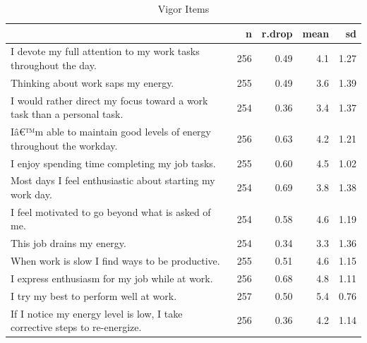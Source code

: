 \documentclass[
]{book}
\begin{document}
\begin{table}

\caption{\label{tab:rdrop5}Vigor Items}
\centering
\begin{tabular}[t]{l|r|r|r|r}
\hline
  & n & r.drop & mean & sd\\
\hline
I devote my full attention to my work tasks throughout the day. & 256 & 0.49 & 4.1 & 1.27\\
\hline
Thinking about work saps my energy. & 255 & 0.49 & 3.6 & 1.39\\
\hline
I would rather direct my focus toward a work task than a personal task. & 254 & 0.36 & 3.4 & 1.37\\
\hline
Iâ€™m able to maintain good levels of energy throughout the workday. & 256 & 0.63 & 4.2 & 1.21\\
\hline
I enjoy spending time completing my job tasks. & 255 & 0.60 & 4.5 & 1.02\\
\hline
Most days I feel enthusiastic about starting my work day. & 254 & 0.69 & 3.8 & 1.38\\
\hline
I feel motivated to go beyond what is asked of me. & 254 & 0.58 & 4.6 & 1.19\\
\hline
This job drains my energy. & 254 & 0.34 & 3.3 & 1.36\\
\hline
When work is slow I find ways to be productive. & 255 & 0.51 & 4.6 & 1.15\\
\hline
I express enthusiasm for my job while at work. & 256 & 0.68 & 4.8 & 1.11\\
\hline
I try my best to perform well at work. & 257 & 0.50 & 5.4 & 0.76\\
\hline
If I notice my energy level is low, I take corrective steps to re-energize. & 256 & 0.36 & 4.2 & 1.14\\
\hline
\end{tabular}
\end{table}
\end{document}
